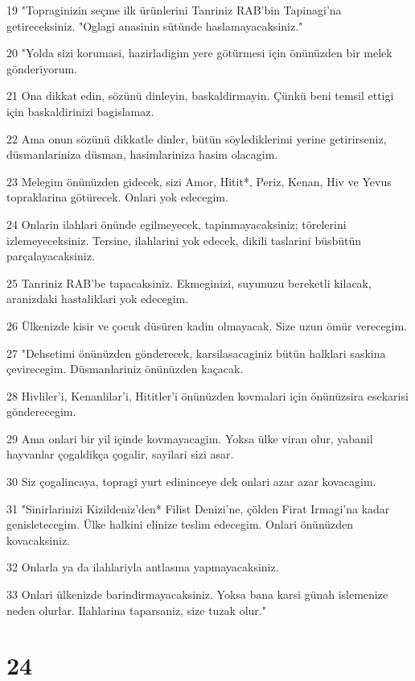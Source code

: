\par 19 "Topraginizin seçme ilk ürünlerini Tanriniz RAB'bin Tapinagi'na getireceksiniz. "Oglagi anasinin sütünde haslamayacaksiniz."
\par 20 "Yolda sizi korumasi, hazirladigim yere götürmesi için önünüzden bir melek gönderiyorum.
\par 21 Ona dikkat edin, sözünü dinleyin, baskaldirmayin. Çünkü beni temsil ettigi için baskaldirinizi bagislamaz.
\par 22 Ama onun sözünü dikkatle dinler, bütün söylediklerimi yerine getirirseniz, düsmanlariniza düsman, hasimlariniza hasim olacagim.
\par 23 Melegim önünüzden gidecek, sizi Amor, Hitit*, Periz, Kenan, Hiv ve Yevus topraklarina götürecek. Onlari yok edecegim.
\par 24 Onlarin ilahlari önünde egilmeyecek, tapinmayacaksiniz; törelerini izlemeyeceksiniz. Tersine, ilahlarini yok edecek, dikili taslarini büsbütün parçalayacaksiniz.
\par 25 Tanriniz RAB'be tapacaksiniz. Ekmeginizi, suyunuzu bereketli kilacak, aranizdaki hastaliklari yok edecegim.
\par 26 Ülkenizde kisir ve çocuk düsüren kadin olmayacak. Size uzun ömür verecegim.
\par 27 "Dehsetimi önünüzden gönderecek, karsilasacaginiz bütün halklari saskina çevirecegim. Düsmanlariniz önünüzden kaçacak.
\par 28 Hivliler'i, Kenanlilar'i, Hititler'i önünüzden kovmalari için önünüzsira esekarisi gönderecegim.
\par 29 Ama onlari bir yil içinde kovmayacagim. Yoksa ülke viran olur, yabanil hayvanlar çogaldikça çogalir, sayilari sizi asar.
\par 30 Siz çogalincaya, topragi yurt edininceye dek onlari azar azar kovacagim.
\par 31 "Sinirlarinizi Kizildeniz'den* Filist Denizi'ne, çölden Firat Irmagi'na kadar genisletecegim. Ülke halkini elinize teslim edecegim. Onlari önünüzden kovacaksiniz.
\par 32 Onlarla ya da ilahlariyla antlasma yapmayacaksiniz.
\par 33 Onlari ülkenizde barindirmayacaksiniz. Yoksa bana karsi günah islemenize neden olurlar. Ilahlarina taparsaniz, size tuzak olur."

\chapter{24}

